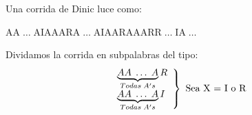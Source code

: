 \documentclass[12pt,a4paper]{report}
\begin{document}
			\par Una corrida de Dinic luce como:
			\begin{center}
				AA$\; \dotsc \;$AIAAARA$\; \dotsc \;$AIAARAAARR$\; \dotsc \;$IA$\; \dotsc \;$
			\end{center}

			\par Dividamos la corrida en subpalabras del tipo:
			\begin{equation*}
		  	\left.
		  	\begin{array}{l}
		    	\underbrace{AA \; \dotsc \; A}_{Todas \; A's}R \\
		    	\underbrace{AA \; \dotsc \; A}_{Todas \; A's}I
		  	\end{array}
		  	\right\rbrace
		  	\textup{ Sea X = I o R}
			\end{equation*}
\end{document}
